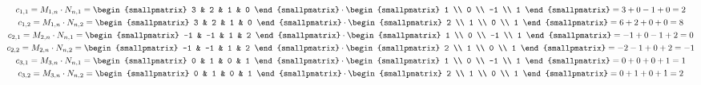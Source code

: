 \begin{gather*}
c_{1,1} = M_{1,n} \cdot N_{n,1} =
\begin{smallpmatrix}
3 & 2 & 1 & 0 
\end{smallpmatrix}
\cdot 
\begin{smallpmatrix}
1 \\
0 \\
-1 \\
1
\end{smallpmatrix}
=
3 + 0 - 1 + 0 = 2 \\
c_{1,2} = M_{1,n} \cdot N_{n,2} =
\begin{smallpmatrix}
3 & 2 & 1 & 0 
\end{smallpmatrix}
\cdot
\begin{smallpmatrix}
2 \\
1 \\
0 \\
1
\end{smallpmatrix}
=
6 + 2 + 0 + 0 = 8 \\
c_{2,1} = M_{2,n} \cdot N_{n,1} =
\begin{smallpmatrix}
-1 & -1 & 1 & 2 
\end{smallpmatrix}
\cdot 
\begin{smallpmatrix}
1 \\
0 \\
-1 \\
1
\end{smallpmatrix}
=
-1 + 0 -1 + 2 = 0 \\
c_{2,2} = M_{2,n} \cdot N_{n,2} =
\begin{smallpmatrix}
-1 & -1 & 1 & 2 
\end{smallpmatrix}
\cdot 
\begin{smallpmatrix}
2 \\
1 \\
0 \\
1
\end{smallpmatrix}
=
-2 -1 + 0 + 2 = -1 \\
c_{3,1} = M_{3,n} \cdot N_{n,1} = 
\begin{smallpmatrix}
0 & 1 & 0 & 1 
\end{smallpmatrix}
\cdot 
\begin{smallpmatrix}
1 \\
0 \\
-1 \\
1
\end{smallpmatrix}
=
0 + 0 + 0 + 1 = 1 \\
c_{3,2} = M_{3,n} \cdot N_{n,2} = 
\begin{smallpmatrix}
0 & 1 & 0 & 1 
\end{smallpmatrix}
\cdot 
\begin{smallpmatrix}
2 \\
1 \\
0 \\
1
\end{smallpmatrix}
=
0 + 1 + 0 + 1 = 2
\end{gather*}
